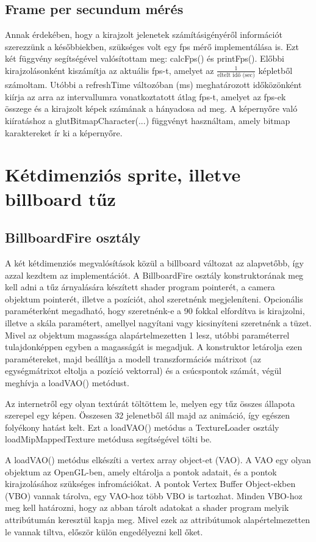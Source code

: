 \subsection{Frame per secundum mérés}
Annak érdekében, hogy a kirajzolt jelenetek számításigényéről információt szerezzünk a későbbiekben, szükséges volt egy fps mérő implementálása is. Ezt két függvény segítségével valósítottam meg: calcFps() és printFps(). Előbbi kirajzolásonként kiszámítja az aktuális fps-t, amelyet az $\frac{1}{\text{eltelt idő (sec)}}$ képletből számoltam. Utóbbi a refreshTime változóban (ms) meghatározott időközönként kiírja az arra az intervallumra vonatkoztatott átlag fps-t, amelyet az fps-ek összege és a kirajzolt képek számának a hányadosa ad meg. A képernyőre való kiíratáshoz a glutBitmapCharacter(...) függvényt használtam, amely bitmap karaktereket ír ki a képernyőre. 


\section{Kétdimenziós sprite, illetve billboard tűz}

\subsection{BillboardFire osztály}
A két kétdimenziós megvalósítások közül a billboard változat az alapvetőbb, így azzal kezdtem az implementációt. A BillboardFire osztály konstruktorának meg kell adni a tűz árnyalására készített shader program pointerét, a camera objektum pointerét, illetve a pozíciót, ahol szeretnénk megjeleníteni. Opcionális paraméterként megadható, hogy szeretnénk-e a 90 fokkal elfordítva is kirajzolni, illetve a skála paramétert, amellyel nagyítani vagy kicsinyíteni szeretnénk a tüzet. Mivel az objektum magassága alapártelmezetten 1 lesz, utóbbi paraméterrel tulajdonképpen egyben a magasságát is megadjuk. A konstruktor letárolja ezen paramétereket, majd beállítja a modell transzformációs mátrixot (az egységmátrixot eltolja a pozíció vektorral) és a csúcspontok számát, végül meghívja a loadVAO() metódust.

Az internetről egy olyan textúrát töltöttem le, melyen egy tűz összes állapota szerepel egy képen. Összesen 32 jelenetből áll majd az animáció, így egészen folyékony hatást kelt. Ezt a loadVAO() metódus a TextureLoader osztály loadMipMappedTexture metódusa segítségével tölti be. 

A loadVAO() metódus elkészíti a vertex array object-et (VAO). A VAO egy olyan objektum az OpenGL-ben, amely eltárolja a pontok adatait, és a pontok kirajzolásához szükséges infromációkat. A pontok Vertex Buffer Object-ekben (VBO) vannak tárolva, egy VAO-hoz több VBO is tartozhat. Minden VBO-hoz meg kell határozni, hogy az abban tárolt adatokat a shader program melyik attribútumán keresztül kapja meg. Mivel ezek az attribútumok alapértelmezetten le vannak tiltva, először külön engedélyezni kell őket. 

